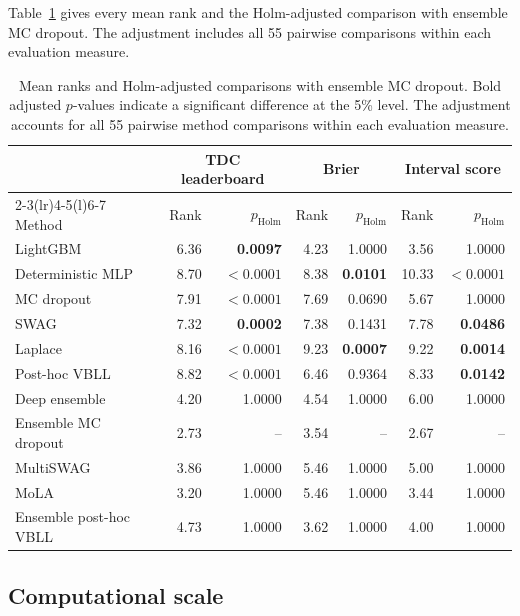 Table~\ref{tab:global-rank-holm} gives every mean rank and the Holm-adjusted comparison with ensemble
MC dropout. The adjustment includes all 55 pairwise comparisons within each evaluation measure.

\begin{table}[!htbp]
\centering
\caption{Mean ranks and Holm-adjusted comparisons with ensemble MC dropout. Bold adjusted
$p$-values indicate a significant difference at the 5\% level. The adjustment accounts for all 55
pairwise method comparisons within each evaluation measure.}
\label{tab:global-rank-holm}
\scriptsize
\setlength{\tabcolsep}{4pt}
\begin{tabular}{@{}lrrrrrr@{}}
\toprule
& \multicolumn{2}{c}{TDC leaderboard} & \multicolumn{2}{c}{Brier} & \multicolumn{2}{c}{Interval score} \\
\cmidrule(lr){2-3}\cmidrule(lr){4-5}\cmidrule(l){6-7}
Method & Rank & $p_{\mathrm{Holm}}$ & Rank & $p_{\mathrm{Holm}}$ & Rank & $p_{\mathrm{Holm}}$ \\
\midrule
LightGBM & 6.36 & \textbf{0.0097} & 4.23 & 1.0000 & 3.56 & 1.0000 \\
Deterministic MLP & 8.70 & \textbf{$<0.0001$} & 8.38 & \textbf{0.0101} & 10.33 & \textbf{$<0.0001$} \\
MC dropout & 7.91 & \textbf{$<0.0001$} & 7.69 & 0.0690 & 5.67 & 1.0000 \\
SWAG & 7.32 & \textbf{0.0002} & 7.38 & 0.1431 & 7.78 & \textbf{0.0486} \\
Laplace & 8.16 & \textbf{$<0.0001$} & 9.23 & \textbf{0.0007} & 9.22 & \textbf{0.0014} \\
Post-hoc VBLL & 8.82 & \textbf{$<0.0001$} & 6.46 & 0.9364 & 8.33 & \textbf{0.0142} \\
Deep ensemble & 4.20 & 1.0000 & 4.54 & 1.0000 & 6.00 & 1.0000 \\
Ensemble MC dropout & 2.73 & -- & 3.54 & -- & 2.67 & -- \\
MultiSWAG & 3.86 & 1.0000 & 5.46 & 1.0000 & 5.00 & 1.0000 \\
MoLA & 3.20 & 1.0000 & 5.46 & 1.0000 & 3.44 & 1.0000 \\
Ensemble post-hoc VBLL & 4.73 & 1.0000 & 3.62 & 1.0000 & 4.00 & 1.0000 \\
\bottomrule
\end{tabular}
\end{table}

\subsection{Computational scale}

